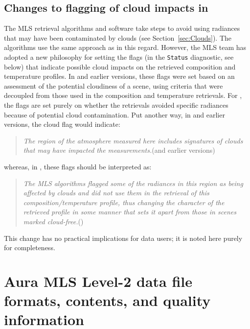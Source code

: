 \subsection{Changes to flagging of cloud impacts in \thisv}
\label{sec:V6CloudWork}
The MLS retrieval algorithms and software take steps to avoid using radiances that may have been contaminated by clouds (see Section~\ref{sec:Clouds}).  The \thisv algorithms use the same approach as \prevv in this regard.  However, the MLS team has adopted a new philosophy for setting the flags (in the \texttt{Status} diagnostic, see below) that indicate possible cloud impacts on the retrieved composition and temperature profiles.  In \prevv and earlier versions, these flags were set based on an assessment of the potential cloudiness of a scene, using criteria that were decoupled from those used in the composition and temperature retrievals.  For \thisv, the flags are set purely on whether the retrievals avoided specific radiances because of potential cloud contamination.  Put another way, in \prevv and earlier versions, the cloud flag would indicate:
\begin{quote}
\emph{The region of the atmosphere measured here includes signatures of clouds that may have impacted the measurements.}\quad(\Prevv and earlier versions)
\end{quote}
whereas, in \thisv, these flags should be interpreted as:
\begin{quote}
\emph{The MLS algorithms flagged some of the radiances in this region as being affected by clouds and did not use them in the retrieval of this composition/temperature profile, thus changing the character of the retrieved profile in some manner that sets it apart from those in scenes marked cloud-free.}\quad(\Thisv)
\end{quote}
This change has no practical implications for data users; it is noted here purely for completeness.


\section{Aura MLS \mbox{Level-2} data file formats, contents, and quality information}
\label{sec:FilesAndFormats}
\label{sec:NegativePrecision}


